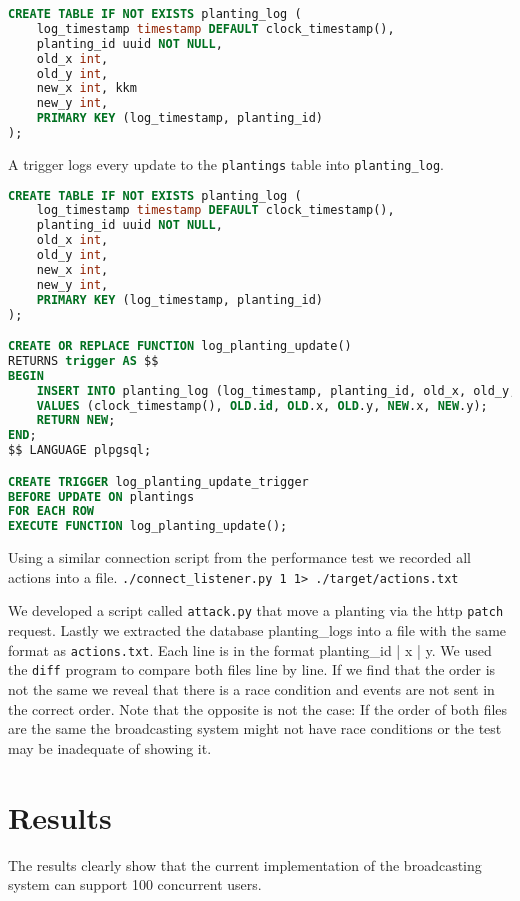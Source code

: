 \documentclass[final,oneside]{vutinfth}
\begin{document}
\begin{lstlisting}[language=sql]
CREATE TABLE IF NOT EXISTS planting_log (
    log_timestamp timestamp DEFAULT clock_timestamp(),
    planting_id uuid NOT NULL,
    old_x int,
    old_y int,
    new_x int, kkm
    new_y int,
    PRIMARY KEY (log_timestamp, planting_id)
);
\end{lstlisting}

A trigger logs every update to the \texttt{plantings} table into \texttt{planting\_log}.

\begin{lstlisting}[language=sql]
CREATE TABLE IF NOT EXISTS planting_log (
    log_timestamp timestamp DEFAULT clock_timestamp(),
    planting_id uuid NOT NULL,
    old_x int,
    old_y int,
    new_x int,
    new_y int,
    PRIMARY KEY (log_timestamp, planting_id)
);

CREATE OR REPLACE FUNCTION log_planting_update()
RETURNS trigger AS $$
BEGIN
    INSERT INTO planting_log (log_timestamp, planting_id, old_x, old_y, new_x, new_y)
    VALUES (clock_timestamp(), OLD.id, OLD.x, OLD.y, NEW.x, NEW.y);
    RETURN NEW;
END;
$$ LANGUAGE plpgsql;

CREATE TRIGGER log_planting_update_trigger
BEFORE UPDATE ON plantings
FOR EACH ROW
EXECUTE FUNCTION log_planting_update();
\end{lstlisting}

Using a similar connection script from the performance test we recorded all actions into a file. \texttt{./connect\_listener.py 1 1> ./target/actions.txt}

We developed a script called \texttt{attack.py} that move a planting via the \gls{http} \texttt{patch} request.
Lastly we extracted the database planting\_logs into a file with the same format as \texttt{actions.txt}.
Each line is in the format planting\_id | x | y.
We used the \texttt{diff} program to compare both files line by line.
If we find that the order is not the same we reveal that there is a race condition and events are not sent in the correct order. 
Note that the opposite is not the case: If the order of both files are the same the broadcasting system might not have race conditions or the test may be inadequate of showing it.

\chapter{Results}

The results clearly show that the current implementation of the broadcasting system can support 100 concurrent users.
\end{document}
